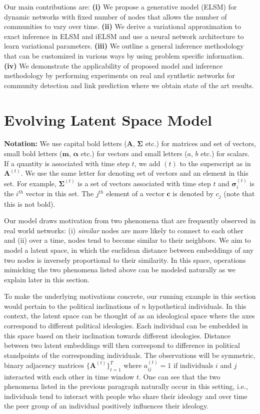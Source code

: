 \documentclass[letterpaper]{article}
\begin{document}
Our main contributions are:
\textbf{(i)} We propose a generative model (ELSM) for dynamic networks with fixed number of nodes that allows the number of communities to vary over time.
\textbf{(ii)} We derive a variational approximation to exact inference in ELSM and iELSM and use a neural network architecture to learn variational parameters.
\textbf{(iii)} We outline a general inference methodology that can be customized in various ways by using problem specific information.
\textbf{(iv)} We demonstrate the applicability of proposed model and inference methodology by performing experiments on real and synthetic networks for community detection and link prediction where we obtain state of the art results.


\section{Evolving Latent Space Model}
\label{section:ELSM}
\textbf{Notation: }We use capital bold letters ($\mathbf{A}$, $\bm{\Sigma}$ etc.) for matrices and set of vectors, small bold letters ($\mathbf{m}$, $\bm{\alpha}$ etc.) for vectors and small letters ($a$, $b$ etc.) for scalars. If a quantity is associated with time step $t$, we add $(t)$ to the superscript as in $\mathbf{A}^{(t)}$. We use the same letter for denoting set of vectors and an element in this set. For example, $\bm{\Sigma}^{(t)}$ is a set of vectors associated with time step $t$ and $\bm{\sigma}_i^{(t)}$ is the $i^{th}$ vector in this set. The $j^{th}$ element of a vector $\mathbf{c}$ is denoted by $c_j$ (note that this is not bold).

Our model draws motivation from two phenomena that are frequently observed in real world networks: (i) \textit{similar} nodes are more likely to connect to each other and (ii) over a time, nodes tend to become similar to their neighbors. We aim to model a latent space, in which the euclidean distance between embeddings of any two nodes is inversely proportional to their similarity. In this space, operations mimicking the two phenomena listed above can be modeled naturally as we explain later in this section.

To make the underlying motivations concrete, our running example in this section would pertain to the political inclinations of $n$ hypothetical individuals. In this context, the latent space can be thought of as an ideological space where the axes correspond to different political ideologies. Each individual can be embedded in this space based on their inclination towards different ideologies. Distance between two latent embeddings will then correspond to difference in political standpoints of the corresponding individuals. The observations will be symmetric, binary adjacency matrices $\mathbf{\{A}^{(t)}\}_{t=1}^T$ where $a_{ij}^{(t)} = 1$ if individuals $i$ and $j$ interacted with each other in time window $t$. One can see that the two phenomena listed in the previous paragraph naturally occur in this setting, i.e., individuals tend to interact with people who share their ideology and over time the peer group of an individual positively influences their ideology.
\end{document}
